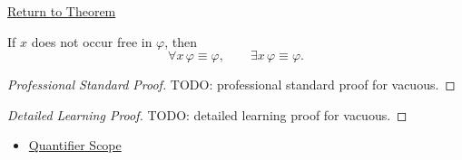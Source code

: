 \newpage
{}
\label{prf:vacuous}

\begin{remark*}[Return]
\hyperref[thm:vacuous]{Return to Theorem}
\end{remark*}

\begin{theorem*}
If \(x\) does not occur free in \(\varphi\), then
\[
\forall x\,\varphi\equiv\varphi,
\qquad
\exists x\,\varphi\equiv\varphi.
\]
\end{theorem*}

\begin{proof}[Professional Standard Proof]
\LRAProofBodyStart
TODO: professional standard proof for vacuous.
\end{proof}

\begin{proof}[Detailed Learning Proof]
\LRAProofBodyStart
TODO: detailed learning proof for vacuous.
\end{proof}

\begin{remark*}
\end{remark*}

\begin{dependencies}
\begin{itemize}
  \item \hyperref[def:quantifier-scope]{Quantifier Scope}
\end{itemize}
\end{dependencies}

\clearpage
